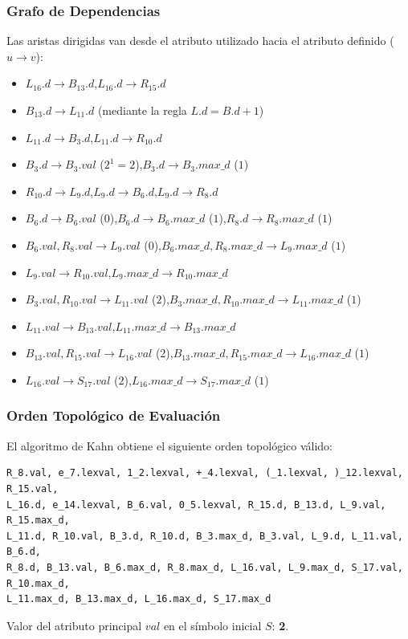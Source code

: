 \documentclass[11pt,a4paper]{article}
\begin{document}
\subsubsection{Grafo de Dependencias}
Las aristas dirigidas van desde el atributo utilizado hacia el atributo definido ($u \rightarrow v$):
\begin{itemize}
    \item $L_{16}.d \rightarrow B_{13}.d$,\quad $L_{16}.d \rightarrow R_{15}.d$
    \item $B_{13}.d \rightarrow L_{11}.d$ (mediante la regla $L.d = B.d + 1$)
    \item $L_{11}.d \rightarrow B_3.d$,\quad $L_{11}.d \rightarrow R_{10}.d$
    \item $B_3.d \rightarrow B_3.val$ ($2^1 = 2$),\quad $B_3.d \rightarrow B_3.max\_d$ ($1$)
    \item $R_{10}.d \rightarrow L_9.d$,\quad $L_9.d \rightarrow B_6.d$,\quad $L_9.d \rightarrow R_8.d$
    \item $B_6.d \rightarrow B_6.val$ ($0$),\quad $B_6.d \rightarrow B_6.max\_d$ ($1$),\quad $R_8.d \rightarrow R_8.max\_d$ ($1$)
    \item $B_6.val, R_8.val \rightarrow L_9.val$ ($0$),\quad $B_6.max\_d, R_8.max\_d \rightarrow L_9.max\_d$ ($1$)
    \item $L_9.val \rightarrow R_{10}.val$,\quad $L_9.max\_d \rightarrow R_{10}.max\_d$
    \item $B_3.val, R_{10}.val \rightarrow L_{11}.val$ ($2$),\quad $B_3.max\_d, R_{10}.max\_d \rightarrow L_{11}.max\_d$ ($1$)
    \item $L_{11}.val \rightarrow B_{13}.val$,\quad $L_{11}.max\_d \rightarrow B_{13}.max\_d$
    \item $B_{13}.val, R_{15}.val \rightarrow L_{16}.val$ ($2$),\quad $B_{13}.max\_d, R_{15}.max\_d \rightarrow L_{16}.max\_d$ ($1$)
    \item $L_{16}.val \rightarrow S_{17}.val$ ($2$),\quad $L_{16}.max\_d \rightarrow S_{17}.max\_d$ ($1$)
\end{itemize}

\subsubsection{Orden Topológico de Evaluación}
El algoritmo de Kahn obtiene el siguiente orden topológico válido:
\begin{lstlisting}
R_8.val, e_7.lexval, 1_2.lexval, +_4.lexval, (_1.lexval, )_12.lexval, R_15.val,
L_16.d, e_14.lexval, B_6.val, 0_5.lexval, R_15.d, B_13.d, L_9.val, R_15.max_d,
L_11.d, R_10.val, B_3.d, R_10.d, B_3.max_d, B_3.val, L_9.d, L_11.val, B_6.d,
R_8.d, B_13.val, B_6.max_d, R_8.max_d, L_16.val, L_9.max_d, S_17.val, R_10.max_d,
L_11.max_d, B_13.max_d, L_16.max_d, S_17.max_d
\end{lstlisting}
Valor del atributo principal $val$ en el símbolo inicial $S$: \textbf{2}.
\end{document}

